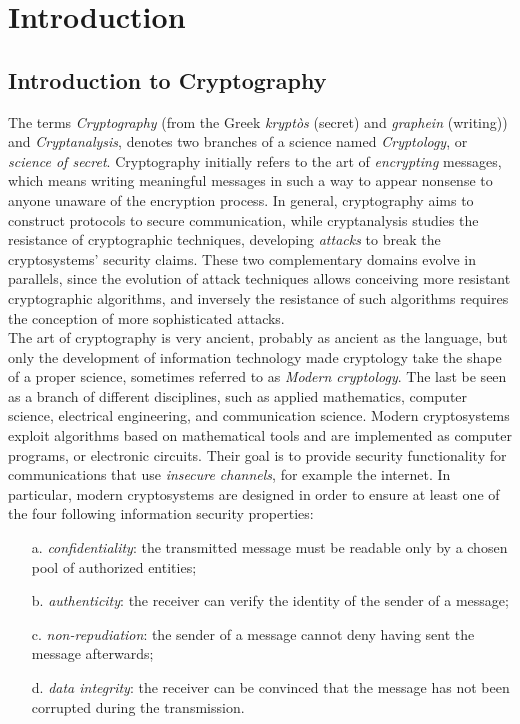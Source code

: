 
\chapter{Introduction} %

\label{ChapterIntroduction}


\section{Introduction to Cryptography}
The terms \emph{Cryptography} (from the Greek \emph{krypt\`os} (secret) and \emph{graphein} (writing)) and \emph{Cryptanalysis}, denotes two branches of a science named \emph{Cryptology}, or \emph{science of secret}. Cryptography initially refers to the art of \emph{encrypting} messages, which means writing meaningful messages in such a way to appear nonsense to anyone unaware of the encryption process. In general, cryptography aims to construct protocols to secure communication, while cryptanalysis studies the resistance of cryptographic techniques, developing \emph{attacks} to break the cryptosystems' security claims. These two complementary domains evolve in parallels, since the evolution of attack techniques allows conceiving more resistant cryptographic algorithms, and inversely the resistance of such algorithms requires the conception of more sophisticated attacks.\\

The art of cryptography is very ancient, probably as ancient as the language, but only the development of information technology made cryptology take the shape of a proper science, sometimes referred to as \emph{Modern cryptology}. The last be seen as a branch of different disciplines, such as applied mathematics, computer science, electrical engineering, and communication science. Modern cryptosystems exploit algorithms based on mathematical tools and are implemented as computer programs, or electronic circuits. Their goal is to provide security functionality for communications that use \emph{insecure channels}, for example the internet. In particular, modern cryptosystems are designed in order to ensure at least one of the four following information security properties:
\begin{itemize}
\item[a.] \emph{confidentiality}: the transmitted message must be readable only by a chosen pool of authorized entities;
\item[b.] \emph{authenticity}: the receiver can verify the identity of the sender of a message;
\item[c.] \emph{non-repudiation}: the sender of a message cannot deny having sent the message afterwards;
\item[d.] \emph{data integrity}: the receiver can be convinced that the message has not been corrupted during the transmission.


\end{itemize} 

